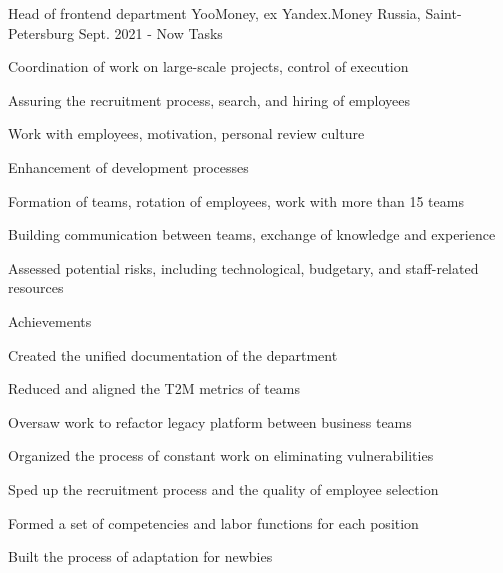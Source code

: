 
\begin{cventries}

  \cvmultientry
    {Head of frontend department}
    {YooMoney, ex Yandex.Money}
    {Russia, Saint-Petersburg}
    {Sept. 2021 - Now}
    {Tasks}
    {
      \begin{cvitems}
        \item {Coordination of work on large-scale projects, control of execution}
        \item {Assuring the recruitment process, search, and hiring of employees}
        \item {Work with employees, motivation, personal review culture}
        \item {Enhancement of development processes}
        \item {Formation of teams, rotation of employees, work with more than 15 teams}
        \item {Building communication between teams, exchange of knowledge and experience}
        \item {Assessed potential risks, including technological, budgetary, and staff-related resources}
      \end{cvitems}
    }
    {Achievements}
    {
      \begin{cvitems}
        \item {Created the unified documentation of the department}
        \item {Reduced and aligned the T2M metrics of teams}
        \item {Oversaw work to refactor legacy platform between business teams}
        \item {Organized the process of constant work on eliminating vulnerabilities}
        \item {Sped up the recruitment process and the quality of employee selection}
        \item {Formed a set of competencies and labor functions for each position}
        \item {Built the process of adaptation for newbies}
      \end{cvitems}
    }


\end{cventries}
